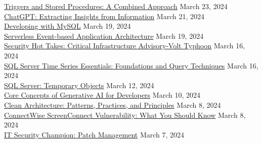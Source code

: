 \documentclass[10pt]{res} %
\begin{document}
\begin{resume}
\href{https://bjdelacruz.dev/files/certificates/pluralsight/Triggers_and_Stored_Procedures_-_A_Combined_Approach.pdf}{\color{blue}Triggers and Stored Procedures: A Combined Approach} \hfill March 23, 2024 \\
\href{https://bjdelacruz.dev/files/certificates/pluralsight/ChatGPT_-_Extracting_Insights_from_Information.pdf}{\color{blue}ChatGPT: Extracting Insights from Information} \hfill March 21, 2024 \\
\href{https://bjdelacruz.dev/files/certificates/pluralsight/Developing_with_MySQL.pdf}{\color{blue}Developing with MySQL} \hfill March 19, 2024 \\
\href{https://bjdelacruz.dev/files/certificates/pluralsight/Serverless_Event-based_Application_Architecture.pdf}{\color{blue}Serverless Event-based Application Architecture} \hfill March 19, 2024 \\
\href{https://bjdelacruz.dev/files/certificates/pluralsight/Security_Hot_Takes_-_Critical_Infrastructure_Advisory-Volt_Typhoon.pdf}{\color{blue}Security Hot Takes: Critical Infrastructure Advisory-Volt Typhoon} \hfill March 16, 2024 \\
\href{https://bjdelacruz.dev/files/certificates/pluralsight/SQL_Server_Time_Series_Essentials_-_Foundations_and_Query_Techniques.pdf}{\color{blue}SQL Server Time Series Essentials: Foundations and Query Techniques} \hfill March 16, 2024 \\
\href{https://bjdelacruz.dev/files/certificates/pluralsight/SQL_Server_-_Temporary_Objects.pdf}{\color{blue}SQL Server: Temporary Objects} \hfill March 12, 2024 \\
\href{https://bjdelacruz.dev/files/certificates/pluralsight/Core_Concepts_of_Generative_AI_for_Developers.pdf}{\color{blue}Core Concepts of Generative AI for Developers} \hfill March 10, 2024 \\
\href{https://bjdelacruz.dev/files/certificates/pluralsight/Clean_Architecture_-_Patterns_Practices_and_Principles.pdf}{\color{blue}Clean Architecture: Patterns, Practices, and Principles} \hfill March 8, 2024 \\
\href{https://bjdelacruz.dev/files/certificates/pluralsight/ConnectWise_ScreenConnect_Vulnerability_-_What_You_Should_Know.pdf}{\color{blue}ConnectWise ScreenConnect Vulnerability: What You Should Know} \hfill March 8, 2024 \\
\href{https://bjdelacruz.dev/files/certificates/pluralsight/IT_Security_Champion_-_Patch_Management.pdf}{\color{blue}IT Security Champion: Patch Management} \hfill March 7, 2024 \\

\end{resume}
\end{document}
